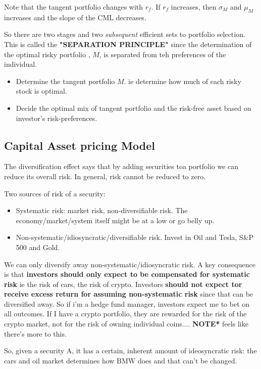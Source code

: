 \documentclass{article}
\begin{document}
Note that the tangent portfolio changes with $r_f$. If $r_f$ increases, then $\sigma_M$ and $\mu_M$ increases and the slope of the CML decreases.

So there are two stages and two \textit{subsequent} efficient sets to portfolio selection. This is called the \textbf{"SEPARATION PRINCIPLE"} since the determination of the optimal risky portfolio , $M$, is separated from teh preferences of the individual. 
\begin{itemize}
\item Determine the tangent portfolio $M$. ie determine how much of each risky stock is optimal.  
\item Decide the optimal mix of tangent portfolio and the risk-free asset based on investor's risk-preferences.
\end{itemize}

\subsection{Capital Asset pricing Model}
The diversification effect says that by adding securities toa portfolio we can reduce its overall risk. In general, risk cannot be reduced to zero.

Two sources of risk of a security:
\begin{itemize}
\item Systematic risk: market risk, non-diversifiable risk. The economy/market/system itself might be at a low or go belly up. 
\item Non-systematic/idiosyncratic/diversifiable risk. Invest in Oil and Tesla, S\&P 500 and Gold.
\end{itemize}



We can only diversify away non-systematic/idiosyncratic risk. A key consequence is that \textbf{investors should only expect to be compensated for systematic risk} ie the risk of cars, the risk of crypto. Investors \textbf{should not expect tor receive excess return for assuming non-systematic risk} since that can be diversified away. So if i'm a hedge fund manager, investors expect me to bet on all outcomes. If I have a crypto portfolio, they are rewarded for the risk of the crypto market, not for the risk of owning individual coins.... \textbf{NOTE*} feels like there's more to this.

So, given a security A, it has a certain, inherent amount of ideosyncratic risk: the cars and oil market determines how BMW does and that can't be changed. 
\end{document}
